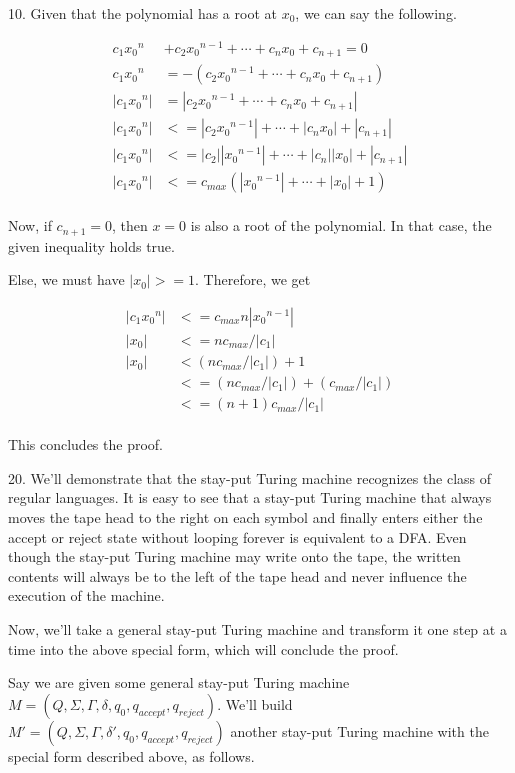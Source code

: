 \documentclass{article}
\begin{document}
10. Given that the polynomial has a root at $x_0$, we can say the following.

\begin{align*}
    c_1 {x_0}^n &+ c_2 {x_0}^{n - 1} + \cdots + c_n x_0 + c_{n + 1} = 0 \\
    c_1 {x_0}^n &= -(c_2 {x_0}^{n - 1} + \cdots + c_n x_0 + c_{n + 1}) \\
    |c_1 {x_0}^n| &= |c_2 {x_0}^{n - 1} + \cdots + c_n x_0 + c_{n + 1}| \\
    |c_1 {x_0}^n| &<= |c_2 {x_0}^{n - 1}| + \cdots + |c_n x_0| + |c_{n + 1}| \\
    |c_1 {x_0}^n| &<= |c_2| |{x_0}^{n - 1}| + \cdots + |c_n| |x_0| + |c_{n + 1}| \\
    |c_1 {x_0}^n| &<= c_{max} (|{x_0}^{n - 1}| + \cdots + |x_0| + 1) \\
\end{align*}

Now, if $c_{n + 1} = 0$, then $x = 0$ is also a root of the polynomial. In that case, the given inequality holds true.

Else, we must have $|x_0| >= 1$. Therefore, we get

\begin{align*}
    |c_1 {x_0}^n| &<= c_{max} n |{x_0}^{n - 1}| \\
    |x_0| &<= n c_{max} / |c_1| \\
    |x_0| &< (n c_{max} / |c_1|) + 1 \\
          &<= (n c_{max} / |c_1|) + (c_{max}/|c_1|) \\
          &<= (n + 1) c_{max} / |c_1| \\
\end{align*}

This concludes the proof.

20. We'll demonstrate that the stay-put Turing machine recognizes the class of regular languages. It is easy to see that a stay-put Turing machine that always moves the tape head to the right on each symbol and finally enters either the accept or reject state without looping forever is equivalent to a DFA. Even though the stay-put Turing machine may write onto the tape, the written contents will always be to the left of the tape head and never influence the execution of the machine.

Now, we'll take a general stay-put Turing machine and transform it one step at a time into the above special form, which will conclude the proof.

Say we are given some general stay-put Turing machine $M = (Q, \Sigma, \Gamma, \delta, q_0, q_{accept}, q_{reject})$. We'll build $M' = (Q, \Sigma, \Gamma, \delta', q_0, q_{accept}, q_{reject})$ another stay-put Turing machine with the special form described above, as follows.
\end{document}
